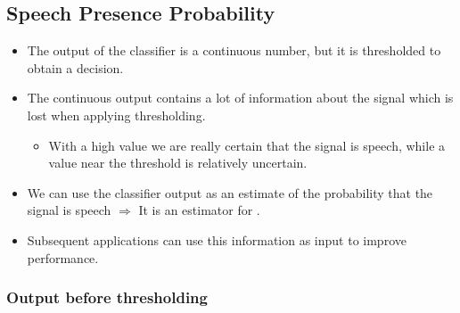 \documentclass[letterpaper,10pt,english]{jupyterBook}
\begin{document}
\subsection{Speech Presence Probability}
\label{\detokenize{Recognition/Voice_activity_detection:speech-presence-probability}}\begin{itemize}
\item {} 
\sphinxAtStartPar
The output of the classifier is a continuous number, but it is
thresholded to obtain a decision.

\item {} 
\sphinxAtStartPar
The continuous output contains a lot of information about the signal
which is lost when applying thresholding.
\begin{itemize}
\item {} 
\sphinxAtStartPar
With a high value we are really certain that the signal is
speech, while a value near the threshold is relatively
uncertain.

\end{itemize}

\item {} 
\sphinxAtStartPar
We can use the classifier output as an estimate of the probability
that the signal is speech \(\Rightarrow\) It is an estimator for
.

\item {} 
\sphinxAtStartPar
Subsequent applications can use this information as input to improve
performance.

\end{itemize}

\sphinxAtStartPar
{}


\subsubsection{Output before thresholding}
\label{\detokenize{Recognition/Voice_activity_detection:output-before-thresholding}}
\sphinxAtStartPar
{}
\end{document}
